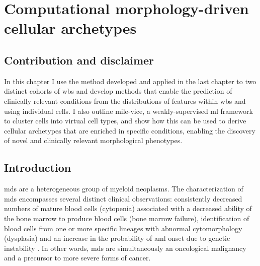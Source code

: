 \chapter{Computational morphology-driven cellular archetypes}

\section{Contribution and disclaimer}

In this chapter I use the method developed and applied in the last chapter to two distinct cohorts of \ac{wbs} and develop methods that enable the prediction of clinically relevant conditions from the distributions of features within \ac{wbs} and using individual cells. I also outline \ac{mile-vice}, a weakly-supervised \ac{ml} framework to cluster cells into virtual cell types, and show how this can be used to derive cellular archetypes that are enriched in specific conditions, enabling the discovery of novel and clinically relevant morphological phenotypes.

\section{Introduction}

\ac{mds} are a heterogeneous group of myeloid neoplasms. The characterization of \ac{mds} encompasses several distinct clinical observations: consistently decreased numbers of mature blood cells (cytopenia) associated with a decreased ability of the bone marrow to produce blood cells (bone marrow failure), identification of blood cells from one or more specific lineages with abnormal cytomorphology (dysplasia) and an increase in the probability of \ac{aml} onset due to genetic instability \cite{Valent2017-uh,Hofmann2005-vv,Aster2020-cu}. In other words, \ac{mds} are simultaneously an oncological malignancy and a precursor to more severe forms of cancer.

